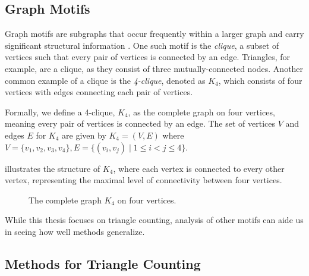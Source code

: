 \documentclass[11pt, margin=1in]{article}
\begin{document}
\subsection{Graph Motifs}

Graph motifs are subgraphs that occur frequently within a larger graph and carry significant structural information \cite{tsourakakis_k-clique_2015, rossi_higher-order_2018}.
One such motif is the \emph{clique}, a subset of vertices such that every pair of vertices is connected by an edge.
Triangles, for example, are a clique, as they consist of three mutually-connected nodes.
Another common example of a clique is the \emph{4-clique}, denoted as \( K_4 \), which consists of four vertices with edges connecting each pair of vertices.

Formally, we define a 4-clique, \( K_4 \), as the complete graph on four vertices, meaning every pair of vertices is connected by an edge. The set of vertices \( V \) and edges \( E \) for \( K_4 \) are given by $K_4 = (V, E)$ where $V = \{ v_1, v_2, v_3, v_4 \}, E = \{ (v_i, v_j) \mid 1 \leq i < j \leq 4 \}$.

 illustrates the structure of \( K_4 \), where each vertex is connected to every other vertex, representing the maximal level of connectivity between four vertices.

\begin{figure}[H]
    \centering
    \caption{The complete graph \( K_4 \) on four vertices.}
    \label{fig:k4}
\end{figure}

While this thesis focuses on triangle counting, analysis of other motifs can aide us in seeing how well methods generalize.

\subsection{Methods for Triangle Counting}
\label{sec:exact-counting}
\end{document}
